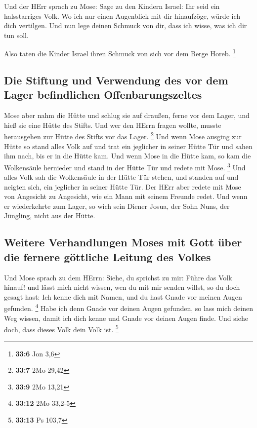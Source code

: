  Und der HErr sprach zu Mose: Sage zu den Kindern Israel:
Ihr seid ein halsstarriges Volk. Wo ich nur einen Augenblick mit dir
hinaufzöge, würde ich dich vertilgen. Und nun lege deinen Schmuck von
dir, dass ich wisse, was ich dir tun soll.

 Also taten die Kinder Israel ihren Schmuck von sich vor
dem Berge Horeb. \footnote{\textbf{33:6} Jon 3,6}

\hypertarget{die-stiftung-und-verwendung-des-vor-dem-lager-befindlichen-offenbarungszeltes}{%
\subsection{Die Stiftung und Verwendung des vor dem Lager befindlichen
Offenbarungszeltes}\label{die-stiftung-und-verwendung-des-vor-dem-lager-befindlichen-offenbarungszeltes}}

 Mose aber nahm die Hütte und schlug sie auf draußen,
ferne vor dem Lager, und hieß sie eine Hütte des Stifts. Und wer den
HErrn fragen wollte, musste herausgehen zur Hütte des Stifts vor das
Lager. \footnote{\textbf{33:7} 2Mo 29,42}  Und wenn Mose
ausging zur Hütte so stand alles Volk auf und trat ein jeglicher in
seiner Hütte Tür und sahen ihm nach, bis er in die Hütte kam.
 Und wenn Mose in die Hütte kam, so kam die Wolkensäule
hernieder und stand in der Hütte Tür und redete mit Mose. \footnote{\textbf{33:9}
  2Mo 13,21}  Und alles Volk sah die Wolkensäule in der
Hütte Tür stehen, und standen auf und neigten sich, ein jeglicher in
seiner Hütte Tür.  Der HErr aber redete mit Mose von
Angesicht zu Angesicht, wie ein Mann mit seinem Freunde redet. Und wenn
er wiederkehrte zum Lager, so wich sein Diener Josua, der Sohn Nuns, der
Jüngling, nicht aus der Hütte.

\hypertarget{weitere-verhandlungen-moses-mit-gott-uxfcber-die-fernere-guxf6ttliche-leitung-des-volkes}{%
\subsection{Weitere Verhandlungen Moses mit Gott über die fernere
göttliche Leitung des
Volkes}\label{weitere-verhandlungen-moses-mit-gott-uxfcber-die-fernere-guxf6ttliche-leitung-des-volkes}}

 Und Mose sprach zu dem HErrn: Siehe, du sprichst zu mir:
Führe das Volk hinauf! und lässt mich nicht wissen, wen du mit mir
senden willst, so du doch gesagt hast: Ich kenne dich mit Namen, und du
hast Gnade vor meinen Augen gefunden. \footnote{\textbf{33:12} 2Mo
  33,2-5}  Habe ich denn Gnade vor deinen Augen gefunden,
so lass mich deinen Weg wissen, damit ich dich kenne und Gnade vor
deinen Augen finde. Und siehe doch, dass dieses Volk dein Volk ist.
\footnote{\textbf{33:13} Ps 103,7}

